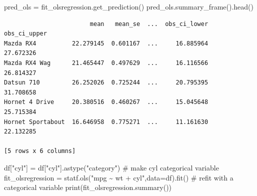 \documentclass[
  letterpaper,
  DIV=11,
  numbers=noendperiod]{scrreprt}
\newenvironment{Shaded}{\begin{snugshade}}{\end{snugshade}}
\newcommand{\BuiltInTok}[1]{\textcolor[rgb]{0.00,0.23,0.31}{#1}}
\newcommand{\CommentTok}[1]{\textcolor[rgb]{0.37,0.37,0.37}{#1}}
\newcommand{\NormalTok}[1]{\textcolor[rgb]{0.00,0.23,0.31}{#1}}
\newcommand{\OperatorTok}[1]{\textcolor[rgb]{0.37,0.37,0.37}{#1}}
\newcommand{\StringTok}[1]{\textcolor[rgb]{0.13,0.47,0.30}{#1}}
\begin{document}
\begin{Shaded}
\begin{Highlighting}[]
\NormalTok{pred\_ols }\OperatorTok{=}\NormalTok{ fit\_olsregression.get\_prediction()}
\NormalTok{pred\_ols.summary\_frame().head()}
\end{Highlighting}
\end{Shaded}

\begin{verbatim}
                        mean   mean_se  ...  obs_ci_lower  obs_ci_upper
Mazda RX4          22.279145  0.601167  ...     16.885964     27.672326
Mazda RX4 Wag      21.465447  0.497629  ...     16.116566     26.814327
Datsun 710         26.252026  0.725244  ...     20.795395     31.708658
Hornet 4 Drive     20.380516  0.460267  ...     15.045648     25.715384
Hornet Sportabout  16.646958  0.775271  ...     11.161630     22.132285

[5 rows x 6 columns]
\end{verbatim}

\begin{Shaded}
\begin{Highlighting}[]
\NormalTok{df[}\StringTok{"cyl"}\NormalTok{] }\OperatorTok{=}\NormalTok{ df[}\StringTok{"cyl"}\NormalTok{].astype(}\StringTok{"category"}\NormalTok{) }\CommentTok{\# make cyl categorical variable}
\NormalTok{fit\_olsregression }\OperatorTok{=}\NormalTok{ statf.ols(}\StringTok{"mpg \textasciitilde{} wt + cyl"}\NormalTok{,data}\OperatorTok{=}\NormalTok{df).fit() }\CommentTok{\# refit with a categorical variable }
\BuiltInTok{print}\NormalTok{(fit\_olsregression.summary())}
\end{Highlighting}
\end{Shaded}
\end{document}

